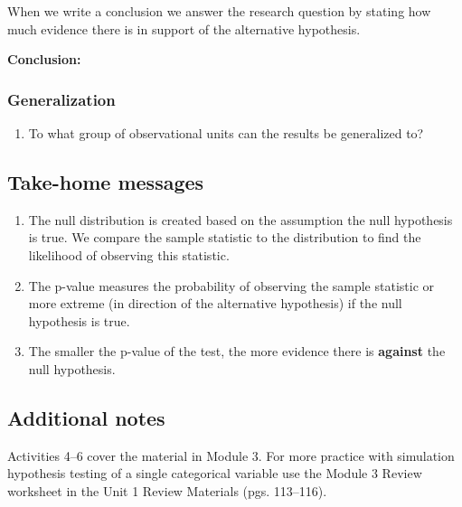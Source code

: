 \documentclass[
]{report}
\providecommand{\tightlist}{%
  \setlength{\itemsep}{0pt}\setlength{\parskip}{0pt}}
\begin{document}
When we write a conclusion we answer the research question by stating how much evidence there is in support of the alternative hypothesis.

\textbf{Conclusion:}

\vspace{1in}

\subsubsection*{Generalization}\label{generalization}

\begin{enumerate}
\def\labelenumi{\arabic{enumi}.}
\setcounter{enumi}{4}
\tightlist
\item
  To what group of observational units can the results be generalized to?
\end{enumerate}

\vspace{0.5in}

\subsection{Take-home messages}\label{take-home-messages-4}

\begin{enumerate}
\def\labelenumi{\arabic{enumi}.}
\item
  The null distribution is created based on the assumption the null hypothesis is true. We compare the sample statistic to the distribution to find the likelihood of observing this statistic.
\item
  The p-value measures the probability of observing the sample statistic or more extreme (in direction of the alternative hypothesis) if the null hypothesis is true.
\item
  The smaller the p-value of the test, the more evidence there is \textbf{against} the null hypothesis.
\end{enumerate}

\subsection{Additional notes}\label{additional-notes-4}

Activities 4--6 cover the material in Module 3. For more practice with simulation hypothesis testing of a single categorical variable use the Module 3 Review worksheet in the Unit 1 Review Materials (pgs. 113--116).
\end{document}
